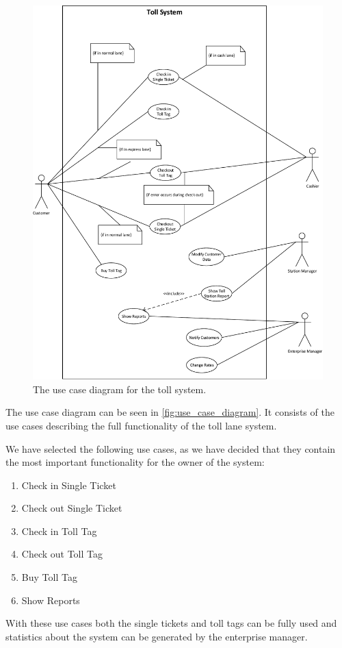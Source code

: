 \begin{figure}
\centering
\includegraphics[width=1\textwidth]{img/use_case_diagram/use_case_diagram}
\caption{The use case diagram for the toll system.}
\label{fig:use_case_diagram}
\end{figure}

The use case diagram can be seen in \autoref{fig:use_case_diagram}. It consists of the use cases describing the full functionality of the toll lane system.

We have selected the following use cases, as we have decided that they contain the most important functionality for the owner of the system:
\begin{enumerate}
\item Check in Single Ticket
\item Check out Single Ticket
\item Check in Toll Tag
\item Check out Toll Tag
\item Buy Toll Tag
\item Show Reports
\end{enumerate}

With these use cases both the single tickets and toll tags can be fully used and statistics about the system can be generated by the enterprise manager.
